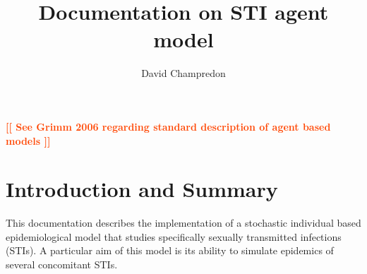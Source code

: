 \documentclass[11pt, onecolumn]{article}
\title{Documentation on STI agent model}
\author{David Champredon}
\newcommand{\warning}[1]{\textbf{\textcolor{OrangeRed}{#1}}}
\begin{document}
\maketitle

\tableofcontents


\newpage

\warning{[[ See Grimm 2006 regarding standard description of agent based models ]]}

\section{Introduction and Summary}

This documentation describes the implementation of a stochastic individual based epidemiological model that studies specifically sexually transmitted infections (STIs). A particular aim of this model is its ability to simulate epidemics of several concomitant STIs.
\end{document}

